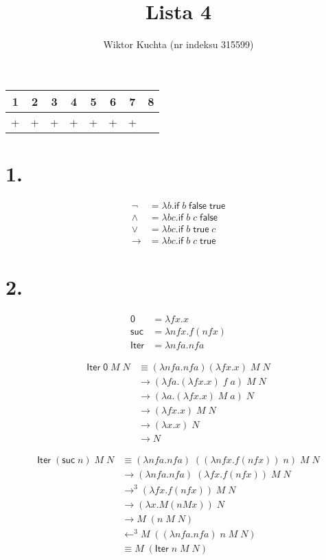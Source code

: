 \documentclass[a4paper, 12pt]{article}
\title{Lista 4}
\author{Wiktor Kuchta (nr indeksu 315599)}
\newcommand{\+}{\enspace}
\begin{document}
\maketitle

\begin{center}
	\begin{tabular}{ |*{8}{c|} }
	\hline
	1 & 2 & 3 & 4 & 5 & 6 & 7 & 8 \\
	\hline
	+ & + & + & + & + & + & + & \\
	\hline
\end{tabular}
\end{center}

\section*{1.}

\begin{align*}
	\lnot &= λb. \mathsf{if}\;b\;\mathsf{false}\;\mathsf{true} \\
	\wedge &= λbc. \mathsf{if}\;b\;c\;\mathsf{false} \\
	\vee &= λbc. \mathsf{if}\;b\;\mathsf{true}\;c \\
	\rightarrow &= λbc. \mathsf{if}\;b\;c\;\mathsf{true}
\end{align*}


\section*{2.}

\begin{align*}
	\mathsf{0} &= λfx.x \\
	\mathsf{suc} &= λnfx. f (nfx) \\
	\mathsf{Iter} &= λnfa. nfa
\end{align*}

\begin{align*}
	\mathsf{Iter}\;\mathsf{0}\;M\;N
	&≡ (λnfa. nfa) (λfx.x)\;M\;N \\
	&\rightarrow (λfa. (λfx.x)\;f\;a)\;M\;N \\
	&\rightarrow (λa. (λfx.x)\;M\;a)\;N \\
	&\rightarrow (λfx.x)\;M\;N \\
	&\rightarrow (λx.x)\;N \\
	&\rightarrow N
\end{align*}

\begin{align*}
	\mathsf{Iter}\;(\mathsf{suc}\;n)\;M\;N
	&≡ (λnfa. nfa)\;((λnfx.f(nfx))\;n)\;M\;N \\
	&\rightarrow (λnfa. nfa)\;(λfx.f(nfx))\;M\;N \\
	&\rightarrow^3 (λfx.f(nfx))\;M\;N \\
	&\rightarrow (λx.M(nMx))\;N \\
	&\rightarrow M\;(n\;M\;N)\\
	&\leftarrow^3 M\;((λnfa. nfa)\;n\;M\;N) \\
	&≡ M\;(\mathsf{Iter}\;n\;M\;N)
\end{align*}
\end{document}
